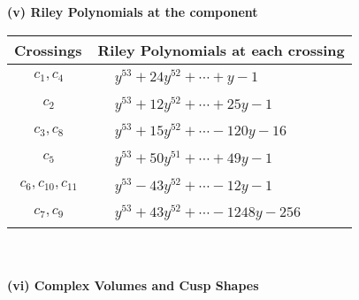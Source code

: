 \documentclass[1p]{elsarticle_modified}
\theoremstyle{definition}
\begin{document}
\newpage\renewcommand{\arraystretch}{1}
\flushleft \textbf{(v) Riley Polynomials at the component}\newline \\
\begin{tabular}{m{50pt}|m{274pt}}
Crossings & \hspace{64pt}Riley Polynomials at each crossing \\
\hline $$\begin{aligned}c_{1},c_{4}\end{aligned}$$&$\begin{aligned}
&y^{53}+24 y^{52}+\cdots+y-1
\end{aligned}$\\
\hline $$\begin{aligned}c_{2}\end{aligned}$$&$\begin{aligned}
&y^{53}+12 y^{52}+\cdots+25 y-1
\end{aligned}$\\
\hline $$\begin{aligned}c_{3},c_{8}\end{aligned}$$&$\begin{aligned}
&y^{53}+15 y^{52}+\cdots-120 y-16
\end{aligned}$\\
\hline $$\begin{aligned}c_{5}\end{aligned}$$&$\begin{aligned}
&y^{53}+50 y^{51}+\cdots+49 y-1
\end{aligned}$\\
\hline $$\begin{aligned}c_{6},c_{10},c_{11}\end{aligned}$$&$\begin{aligned}
&y^{53}-43 y^{52}+\cdots-12 y-1
\end{aligned}$\\
\hline $$\begin{aligned}c_{7},c_{9}\end{aligned}$$&$\begin{aligned}
&y^{53}+43 y^{52}+\cdots-1248 y-256
\end{aligned}$\\
\hline
\end{tabular}\\~\\
\newpage\flushleft \textbf{(vi) Complex Volumes and Cusp Shapes}
\end{document}
